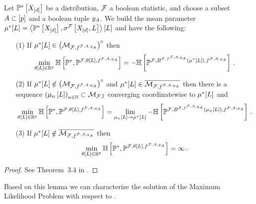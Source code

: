 \begin{lemma}
    \label{lem:minCrossEntropyExponential}
    Let $\mathbb{P}^*\left[X_{[d]}\right]$ be a distribution, $\mathcal{F}$ a boolean statistic, and choose a subset $A\subset[p]$ and a boolean tuple $y_{A}$.
    We build the mean parameter $\mu^*[L]=\left\langle \mathbb{P}^*\left[X_{[d]}\right],\sigma^{\mathcal{F}}\left[X_{[d]},L\right]\right\rangle \left[ L \right]$ and have the following:
    \begin{itemize}
        \item[(1)] If $\mu^*[L] \in {\left(\mathcal{M}_{\mathcal{F},f^{\mathcal{F},A,y_{A}}}\right)}^{\circ}$ then
        \begin{align*}
            \min_{\theta\left[L\right]\in\mathbb{R}^{p}} \mathbb{H}\left[\mathbb{P}^*,\mathbb{P}^{\mathcal{F},\theta\left[L\right],f^{\mathcal{F},A,y_{A}}}\right]
            = -\mathbb{H}\left[\mathbb{P}^{\mathcal{F},B^{\mathcal{F},f^{\mathcal{F},A,y_{A}}}(\mu^*[L]),f^{\mathcal{F},A,y_{A}}}\right] \, .
        \end{align*}
        \item[(2)] If $\mu^*[L] \notin {\left(\mathcal{M}_{\mathcal{F},f^{\mathcal{F},A,y_{A}}}\right)}^{\circ}$ and $\mu^*[L]\in\overline{\mathcal{M}_{\mathcal{F},f^{\mathcal{F},A,y_{A}}}}$ then there is a sequence $\left(\mu_{n}\left[L\right]\right)_{n\in\mathbb{N}}\subset\mathcal{M}_{\mathcal{F},\mathbb{I}}$ converging coordinatewise to $\mu^*[L]$ and
        \begin{align*}
            \min_{\theta\left[L\right]\in\mathbb{R}^{p}} \mathbb{H}\left[\mathbb{P}^*,\mathbb{P}^{\mathcal{F},\theta\left[L\right],f^{\mathcal{F},A,y_{A}}}\right]
            = \lim_{\mu_{n}\left[L\right]\rightarrow\mu^*[L]}-\mathbb{H}\left[\mathbb{P}^{\mathcal{F},B^{\mathcal{F},f^{\mathcal{F},A,y_{A}}}(\mu_{n}\left[L\right]),f^{\mathcal{F},A,y_{A}}}\right] \, .
        \end{align*}
        \item[(3)] If $\mu^*[L]\notin\overline{\mathcal{M}_{\mathcal{F},f^{\mathcal{F},A,y_{A}}}}$ then
        \begin{align*}
            \min_{\theta\left[L\right]\in\mathbb{R}^{p}} \mathbb{H}\left[\mathbb{P}^*,\mathbb{P}^{\mathcal{F},\theta\left[L\right],f^{\mathcal{F},A,y_{A}}}\right]
            = \infty \, .
        \end{align*}
    \end{itemize}
\end{lemma}
\begin{proof}
    See Theorem~3.4 in \cite{wainwright_graphical_2008}.
\end{proof}

Based on this lemma we can characterize the solution of the Maximum Likelihood Problem  with respect to \HybridLogicNetworks{}.

